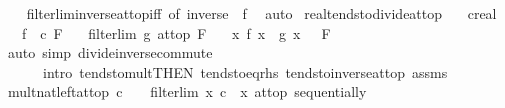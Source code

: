 \begin{isabellebody}
%
\isadelimproof
\ \ %
\endisadelimproof
%
\isatagproof
{}\isamarkupfalse%
\ filterlim{\isacharunderscore}{\kern0pt}inverse{\isacharunderscore}{\kern0pt}at{\isacharunderscore}{\kern0pt}top{\isacharunderscore}{\kern0pt}iff\ {\isacharbrackleft}{\kern0pt}of\ {\isachardoublequoteopen}inverse\ {\isasymcirc}\ f{\isachardoublequoteclose}{\isacharbrackright}{\kern0pt}\ \isamarkupfalse%
\ auto%
\endisatagproof
{\isafoldproof}%
%
\isadelimproof
\isanewline
%
\endisadelimproof
\isanewline
{}\isamarkupfalse%
\ real{\isacharunderscore}{\kern0pt}tendsto{\isacharunderscore}{\kern0pt}divide{\isacharunderscore}{\kern0pt}at{\isacharunderscore}{\kern0pt}top{\isacharcolon}{\kern0pt}\isanewline
\ \ \ c{\isacharcolon}{\kern0pt}{\isacharcolon}{\kern0pt}{\isachardoublequoteopen}real{\isachardoublequoteclose}\isanewline
\ \ \ {\isachardoublequoteopen}{\isacharparenleft}{\kern0pt}f\ {\isasymlonglongrightarrow}\ c{\isacharparenright}{\kern0pt}\ F{\isachardoublequoteclose}\isanewline
\ \ \ {\isachardoublequoteopen}filterlim\ g\ at{\isacharunderscore}{\kern0pt}top\ F{\isachardoublequoteclose}\isanewline
\ \ \ {\isachardoublequoteopen}{\isacharparenleft}{\kern0pt}{\isacharparenleft}{\kern0pt}{\isasymlambda}x{\isachardot}{\kern0pt}\ f\ x\ {\isacharslash}{\kern0pt}\ g\ x{\isacharparenright}{\kern0pt}\ {\isasymlonglongrightarrow}\ {}{\isacharparenright}{\kern0pt}\ F{\isachardoublequoteclose}\isanewline
%
\isadelimproof
\ \ %
\endisadelimproof
%
\isatagproof
{}\isamarkupfalse%
\ {\isacharparenleft}{\kern0pt}auto\ simp{\isacharcolon}{\kern0pt}\ divide{\isacharunderscore}{\kern0pt}inverse{\isacharunderscore}{\kern0pt}commute\isanewline
\ \ \ \ \ \ intro{\isacharbang}{\kern0pt}{\isacharcolon}{\kern0pt}\ tendsto{\isacharunderscore}{\kern0pt}mult{\isacharbrackleft}{\kern0pt}THEN\ tendsto{\isacharunderscore}{\kern0pt}eq{\isacharunderscore}{\kern0pt}rhs{\isacharbrackright}{\kern0pt}\ tendsto{\isacharunderscore}{\kern0pt}inverse{\isacharunderscore}{\kern0pt}{}{\isacharunderscore}{\kern0pt}at{\isacharunderscore}{\kern0pt}top\ assms{\isacharparenright}{\kern0pt}%
\endisatagproof
{\isafoldproof}%
%
\isadelimproof
\isanewline
%
\endisadelimproof
\isanewline
{}\isamarkupfalse%
\ mult{\isacharunderscore}{\kern0pt}nat{\isacharunderscore}{\kern0pt}left{\isacharunderscore}{\kern0pt}at{\isacharunderscore}{\kern0pt}top{\isacharcolon}{\kern0pt}\ {\isachardoublequoteopen}c\ {\isachargreater}{\kern0pt}\ {}\ {\isasymLongrightarrow}\ filterlim\ {\isacharparenleft}{\kern0pt}{\isasymlambda}x{\isachardot}{\kern0pt}\ c\ {\isacharasterisk}{\kern0pt}\ x{\isacharparenright}{\kern0pt}\ at{\isacharunderscore}{\kern0pt}top\ sequentially{\isachardoublequoteclose}\isanewline

\end{isabellebody}
